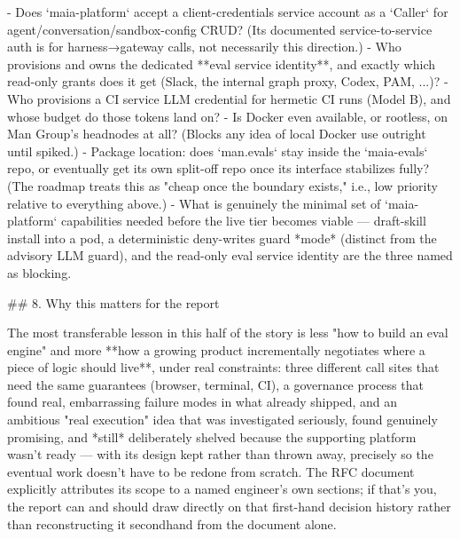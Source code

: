 - Does `maia-platform` accept a client-credentials service account as a `Caller` for agent/conversation/sandbox-config CRUD? (Its documented service-to-service auth is for harness→gateway calls, not necessarily this direction.)
- Who provisions and owns the dedicated **eval service identity**, and exactly which read-only grants does it get (Slack, the internal graph proxy, Codex, PAM, ...)?
- Who provisions a CI service LLM credential for hermetic CI runs (Model B), and whose budget do those tokens land on?
- Is Docker even available, or rootless, on Man Group's headnodes at all? (Blocks any idea of local Docker use outright until spiked.)
- Package location: does `man.evals` stay inside the `maia-evals` repo, or eventually get its own split-off repo once its interface stabilizes fully? (The roadmap treats this as "cheap once the boundary exists," i.e., low priority relative to everything above.)
- What is genuinely the minimal set of `maia-platform` capabilities needed before the live tier becomes viable — draft-skill install into a pod, a deterministic deny-writes guard *mode* (distinct from the advisory LLM guard), and the read-only eval service identity are the three named as blocking.

## 8. Why this matters for the report

The most transferable lesson in this half of the story is less "how to build an eval engine" and more **how a growing product incrementally negotiates where a piece of logic should live**, under real constraints: three different call sites that need the same guarantees (browser, terminal, CI), a governance process that found real, embarrassing failure modes in what already shipped, and an ambitious "real execution" idea that was investigated seriously, found genuinely promising, and *still* deliberately shelved because the supporting platform wasn't ready — with its design kept rather than thrown away, precisely so the eventual work doesn't have to be redone from scratch. The RFC document explicitly attributes its scope to a named engineer's own sections; if that's you, the report can and should draw directly on that first-hand decision history rather than reconstructing it secondhand from the document alone.
